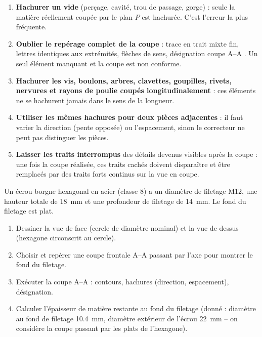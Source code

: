 \documentclass[11pt]{article}
\begin{document}
\begin{attention}
\begin{enumerate}
\item \textbf{Hachurer un vide} (perçage, cavité, trou de passage, gorge) : seule la matière réellement coupée par le plan $P$ est hachurée. C'est l'erreur la plus fréquente.
\item \textbf{Oublier le repérage complet de la coupe} : trace en trait mixte fin, lettres identiques aux extrémités, flèches de sens, désignation \og coupe A--A \fg. Un seul élément manquant et la coupe est non conforme.
\item \textbf{Hachurer les vis, boulons, arbres, clavettes, goupilles, rivets, nervures et rayons de poulie coupés longitudinalement} : ces éléments ne se hachurent jamais dans le sens de la longueur.
\item \textbf{Utiliser les mêmes hachures pour deux pièces adjacentes} : il faut varier la direction (pente opposée) ou l'espacement, sinon le correcteur ne peut pas distinguer les pièces.
\item \textbf{Laisser les traits interrompus} des détails devenus visibles après la coupe : une fois la coupe réalisée, ces traits cachés doivent disparaître et être remplacés par des traits forts continus sur la vue en coupe.
\end{enumerate}
\end{attention}

\begin{exercice}
Un écrou borgne hexagonal en acier (classe 8) a un diamètre de filetage M12, une hauteur totale de \SI{18}{mm} et une profondeur de filetage de \SI{14}{mm}. Le fond du filetage est plat.
\begin{enumerate}
\item Dessiner la vue de face (cercle de diamètre nominal) et la vue de dessus (hexagone circonscrit au cercle).
\item Choisir et repérer une coupe frontale A--A passant par l'axe pour montrer le fond du filetage.
\item Exécuter la coupe A--A : contours, hachures (direction, espacement), désignation.
\item Calculer l'épaisseur de matière restante au fond du filetage (donné : diamètre au fond de filetage \SI{10,4}{mm}, diamètre extérieur de l'écrou \SI{22}{mm} -- on considère la coupe passant par les plats de l'hexagone).
\end{enumerate}
\end{exercice}
\end{document}
